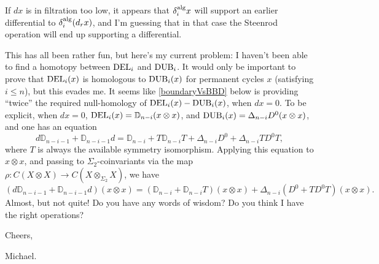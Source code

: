 \documentclass[10pt]{article}
\begin{document}
\begin{letter to Dwyer}
If $dx$ is in filtration too low, it appears that $\delta_i^\textup{alg}x$ will support an earlier differential to $\delta_i^\textup{alg}(d_rx)$, and I'm guessing that in that case the Steenrod operation will end up supporting a differential.

This has all been rather fun, but here's my current problem: I haven't been able to find a homotopy between $\textup{DEL}_i$ and $\textup{DUB}_i$. It would only be important to prove that $\textup{DEL}_i(x)$ is homologous to $\textup{DUB}_i(x)$ for permanent cycles $x$ (satisfying $i\leq n$), but this evades me. It seems like \ref{boundaryVsBBD} below is providing ``twice'' the required null-homology of $\textup{DEL}_i(x)-\textup{DUB}_i(x)$, when $dx=0$. To be explicit, when $dx=0$, $\textup{DEL}_i(x)=\mathbb{D}_{n-i}(x\otimes x)$, and $\textup{DUB}_i(x)=\Delta_{n-i}D^0(x\otimes x)$, and one has an equation
\[d\mathbb{D}_{n-i-1}+\mathbb{D}_{n-i-1}d=\mathbb{D}_{n-i}+T\mathbb{D}_{n-i}T +\Delta_{n-i}D^0+\Delta_{n-i}TD^0T,\]
where $T$ is always the available symmetry isomorphism. Applying this equation to $x\otimes x$, and passing to $\Sigma_2$-coinvariants via the map $\rho:C(X\otimes X)\to C(X\otimes_{\Sigma_2} X)$, we have
\[(d\mathbb{D}_{n-i-1}+\mathbb{D}_{n-i-1}d)(x\otimes x)=(\mathbb{D}_{n-i}+\mathbb{D}_{n-i}T)(x\otimes x)+\Delta_{n-i}(D^0+T D^0 T)(x\otimes x).\]
Almost, but not quite! Do you have any words of wisdom? Do you think I have the right operations?

Cheers,

 Michael.

\end{letter to Dwyer}
\end{document}
